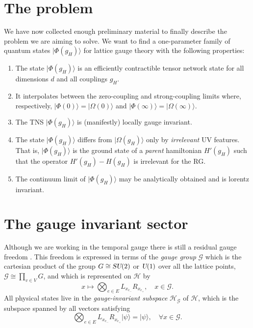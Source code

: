 \documentclass[twocolumn,lengthcheck,superscriptaddress]{revtex4-1}
\def\su2{\textsl{SU}(2)}
\def\uone{\textsl{U}(1)}
\theoremstyle{definition}
\theoremstyle{remark}
\begin{document}
\section{The problem}\label{sec:problem}
We have now collected enough preliminary material to finally describe the problem we are aiming to solve. We want to find a one-parameter family of quantum states $|\Phi(g_H)\rangle$ for lattice gauge theory with the following properties:
\begin{enumerate}
	\item The state $|\Phi(g_H)\rangle$ is an efficiently contractible tensor network state for all dimensions $d$ and all couplings $g_H$.
	\item It interpolates between the zero-coupling and strong-coupling limits where, respectively, $|\Phi(0)\rangle = |\Omega(0)\rangle$ and $|\Phi(\infty)\rangle = |\Omega(\infty)\rangle$. 
	\item The TNS $|\Phi(g_H)\rangle$ is (manifestly) locally gauge invariant.
	\item The state $|\Phi(g_H)\rangle$ differs from $|\Omega(g_H)\rangle$ only by \emph{irrelevant} UV features. That is, $|\Phi(g_H)\rangle$ is the ground state of a \emph{parent} hamiltonian $H'(g_H)$ such that the operator $H'(g_H)-H(g_H)$ is irrelevant for the RG. 
	\item The continuum limit of $|\Phi(g_H)\rangle$ may be analytically obtained and is lorentz invariant.
\end{enumerate} 




\section{The gauge invariant sector}\label{sec:gis}
Although we are working in the temporal gauge there is still a residual gauge freedom \cite{creutz:1985a}. This freedom is expressed in terms of the \emph{gauge group} $\mathcal{G}$ which is the cartesian product of the group $G \cong \su2$ or $\uone$ over all the lattice points, $\mathcal{G}\cong \prod_{v\in V} G$, and which is represented on $\mathcal{H}$ by 
\begin{equation}
	x \mapsto \bigotimes_{e\in E} L_{x_{e_-}}R_{x_{e_+}}, \quad x\in \mathcal{G}.
\end{equation}
All physical states live in the \emph{gauge-invariant subspace} $\mathcal{H}_{\mathcal{G}}$ of $\mathcal{H}$, which is the subspace  spanned by all vectors satisfying
\begin{equation}
	\bigotimes_{e\in E} L_{x_{e_-}}R_{x_{e_+}}|\psi\rangle = |\psi\rangle, \quad \forall x \in \mathcal{G}.
\end{equation}
\end{document}
